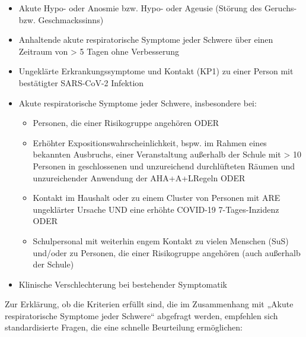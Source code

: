 \documentclass{article}
\begin{document}
\begin{itemize}
\item Akute Hypo- oder Anosmie bzw. Hypo- oder Ageusie (Störung des Geruchs- bzw. Geschmackssinns) 


\item Anhaltende akute respiratorische Symptome jeder Schwere über einen Zeitraum von > 5 Tagen ohne Verbesserung 


\item Ungeklärte Erkrankungssymptome und Kontakt (KP1) zu einer Person mit bestätigter SARS-CoV-2 Infektion 


\item Akute respiratorische Symptome jeder Schwere, insbesondere bei:

\begin{itemize}
\item Personen, die einer Risikogruppe angehören ODER 


\end{itemize}
\begin{itemize}
\item Erhöhter Expositionswahrscheinlichkeit, bspw. im Rahmen eines bekannten Ausbruchs, einer Veranstaltung außerhalb der Schule mit > 10 Personen in geschlossenen und unzureichend durchlüfteten Räumen und unzureichender Anwendung der AHA+A+LRegeln ODER 


\item Kontakt im Haushalt oder zu einem Cluster von Personen mit ARE ungeklärter Ursache UND eine erhöhte COVID-19 7-Tages-Inzidenz ODER 


\item Schulpersonal mit weiterhin engem Kontakt zu vielen Menschen (SuS) und/oder zu Personen, die einer Risikogruppe angehören (auch außerhalb der Schule)


\end{itemize}

\item Klinische Verschlechterung bei bestehender Symptomatik


\end{itemize}

Zur Erklärung, ob die Kriterien erfüllt sind, die im Zusammenhang mit „Akute respiratorische Symptome jeder Schwere“ abgefragt werden, empfehlen sich standardisierte Fragen, die eine schnelle Beurteilung ermöglichen:
\end{document}
